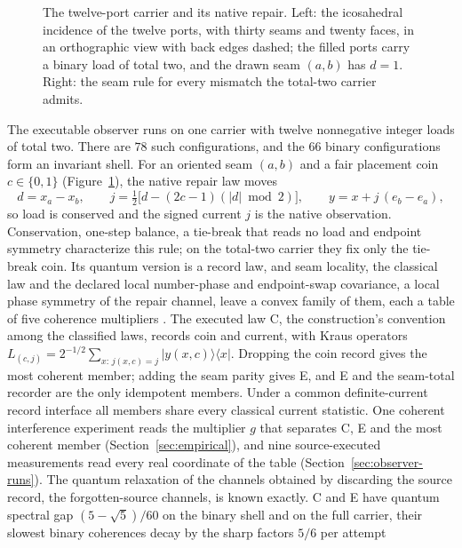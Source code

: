 \documentclass[11pt]{article}
\theoremstyle{definition}
\theoremstyle{remark}
\begin{document}
\begin{figure}[!htb]
\centering

\caption{The twelve-port carrier and its native repair. Left: the icosahedral incidence of the twelve ports, with thirty seams and twenty faces, in an orthographic view with back edges dashed; the filled ports carry a binary load of total two, and the drawn seam $(a,b)$ has $d=1$. Right: the seam rule for every mismatch the total-two carrier admits.}
\label{fig:carrier}
\end{figure}

The executable observer runs on one carrier with twelve nonnegative integer
loads of total two. There are $78$ such configurations, and the $66$ binary
configurations form an invariant shell. For an oriented seam $(a,b)$ and a
fair placement coin $c\in\{0,1\}$ (Figure~\ref{fig:carrier}), the native repair law moves
\begin{equation}
d=x_a-x_b,\qquad
j=\tfrac12\bigl[d-(2c-1)(|d|\bmod 2)\bigr],\qquad
y=x+j\,(e_b-e_a),
\label{eq:native-repair}
\end{equation}
so load is conserved and the signed current $j$ is the native observation.
Conservation, one-step balance, a tie-break that reads no load and endpoint
symmetry characterize this rule; on the total-two carrier they fix only the
tie-break coin. Its quantum version is a record law, and seam
locality, the classical law and the declared local number-phase and
endpoint-swap covariance, a local phase symmetry of the repair channel, leave a convex
family of them, each a table of five coherence multipliers
\cite{ophrecordlaws}. The executed law C, the construction's convention among
the classified laws, records coin and current, with Kraus
operators $L_{(c,j)}=2^{-1/2}\sum_{x:\,j(x,c)=j}|y(x,c)\rangle\langle x|$.
Dropping the coin record gives the most coherent member; adding the seam
parity gives E, and E and the seam-total recorder are the only idempotent
members. Under a common definite-current record interface all members
share every classical current statistic. One coherent interference
experiment reads the multiplier $g$ that separates C, E and the most
coherent member (Section~\ref{sec:empirical}), and nine source-executed
measurements read every real coordinate of the table
(Section~\ref{sec:observer-runs}).
The quantum relaxation of the channels obtained by discarding the source record, the forgotten-source channels, is known exactly.
C and E have quantum spectral gap $(5-\sqrt5)/60$ on the binary shell and
on the full carrier, their slowest binary coherences decay by the sharp factors $5/6$ per attempt
\end{document}
